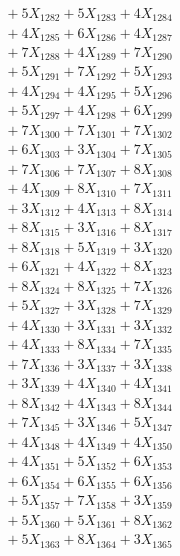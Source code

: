 \documentclass[a4paper,10pt]{article}
\begin{document}
{\begin{align}
&\;  + 5 X_{1282} + 5 X_{1283} + 4 X_{1284} \\[0.3ex]
&\;  + 4 X_{1285} + 6 X_{1286} + 4 X_{1287} \\[0.3ex]
&\;  + 7 X_{1288} + 4 X_{1289} + 7 X_{1290} \\[0.3ex]
&\;  + 5 X_{1291} + 7 X_{1292} + 5 X_{1293} \\[0.3ex]
&\;  + 4 X_{1294} + 4 X_{1295} + 5 X_{1296} \\[0.3ex]
&\;  + 5 X_{1297} + 4 X_{1298} + 6 X_{1299} \\[0.5ex]\allowbreak
&\;  + 7 X_{1300} + 7 X_{1301} + 7 X_{1302} \\[0.3ex]
&\;  + 6 X_{1303} + 3 X_{1304} + 7 X_{1305} \\[0.3ex]
&\;  + 7 X_{1306} + 7 X_{1307} + 8 X_{1308} \\[0.3ex]
&\;  + 4 X_{1309} + 8 X_{1310} + 7 X_{1311} \\[0.3ex]
&\;  + 3 X_{1312} + 4 X_{1313} + 8 X_{1314} \\[0.3ex]
&\;  + 8 X_{1315} + 3 X_{1316} + 8 X_{1317} \\[0.3ex]
&\;  + 8 X_{1318} + 5 X_{1319} + 3 X_{1320} \\[0.3ex]
&\;  + 6 X_{1321} + 4 X_{1322} + 8 X_{1323} \\[0.3ex]
&\;  + 8 X_{1324} + 8 X_{1325} + 7 X_{1326} \\[0.3ex]
&\;  + 5 X_{1327} + 3 X_{1328} + 7 X_{1329} \\[0.5ex]\allowbreak
&\;  + 4 X_{1330} + 3 X_{1331} + 3 X_{1332} \\[0.3ex]
&\;  + 4 X_{1333} + 8 X_{1334} + 7 X_{1335} \\[0.3ex]
&\;  + 7 X_{1336} + 3 X_{1337} + 3 X_{1338} \\[0.3ex]
&\;  + 3 X_{1339} + 4 X_{1340} + 4 X_{1341} \\[0.3ex]
&\;  + 8 X_{1342} + 4 X_{1343} + 8 X_{1344} \\[0.3ex]
&\;  + 7 X_{1345} + 3 X_{1346} + 5 X_{1347} \\[0.3ex]
&\;  + 4 X_{1348} + 4 X_{1349} + 4 X_{1350} \\[0.3ex]
&\;  + 4 X_{1351} + 5 X_{1352} + 6 X_{1353} \\[0.3ex]
&\;  + 6 X_{1354} + 6 X_{1355} + 6 X_{1356} \\[0.3ex]
&\;  + 5 X_{1357} + 7 X_{1358} + 3 X_{1359} \\[0.5ex]\allowbreak
&\;  + 5 X_{1360} + 5 X_{1361} + 8 X_{1362} \\[0.3ex]
&\;  + 5 X_{1363} + 8 X_{1364} + 3 X_{1365} \\[0.3ex]

\end{align}}
\end{document}
